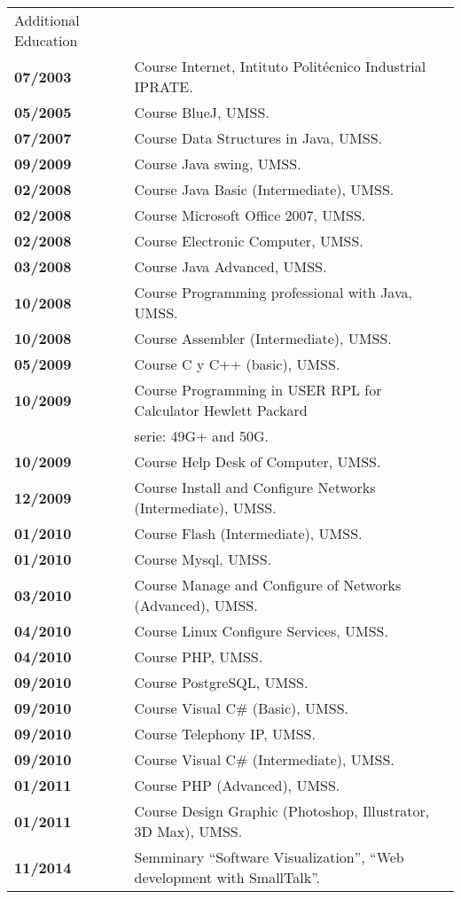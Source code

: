 \documentclass[letterpaper,11pt,oneside]{article}
\newcommand*{\textquotedouble}[1]{\textquotedblleft #1\textquotedblright}
\begin{document}
\noindent \begin{tabular}{l l}
	\Large{\textcolor{mygray}{Additional Education}} & \\	
	\textbf{07/2003} 	& Course Internet, Intituto Politécnico Industrial IPRATE. \\
 	\textbf{05/2005}	& Course BlueJ, UMSS. \\
 	\textbf{07/2007}	& Course Data Structures in Java, UMSS. \\
 	\textbf{09/2009}	& Course Java swing, UMSS. \\
 	\textbf{02/2008}	& Course Java Basic (Intermediate), UMSS. \\
 	\textbf{02/2008}	& Course Microsoft Office 2007, UMSS. \\
 	\textbf{02/2008}	& Course Electronic Computer, UMSS. \\
 	\textbf{03/2008}	& Course Java Advanced, UMSS. \\
 	\textbf{10/2008}	& Course Programming professional with Java, UMSS. \\
 	\textbf{10/2008}	& Course Assembler (Intermediate), UMSS. \\
 	\textbf{05/2009}	& Course C y C++ (basic), UMSS. \\
 	\textbf{10/2009}	& Course Programming in USER RPL for Calculator Hewlett Packard \\
 						& serie: 49G+ and 50G. \\  
 	\textbf{10/2009} 	& Course Help Desk of Computer, UMSS. \\
 	\textbf{12/2009}	& Course Install and Configure Networks (Intermediate), UMSS. \\
 	\textbf{01/2010}	& Course Flash (Intermediate), UMSS. \\
 	\textbf{01/2010}	& Course Mysql, UMSS. \\
 	\textbf{03/2010}	& Course Manage and Configure of Networks (Advanced), UMSS. \\
 	\textbf{04/2010}	& Course Linux Configure Services, UMSS. \\
 	\textbf{04/2010}	& Course PHP, UMSS. \\
 	\textbf{09/2010}	& Course PostgreSQL, UMSS. \\
 	\textbf{09/2010}	& Course Visual C\# (Basic), UMSS.\\
 	\textbf{09/2010}	& Course Telephony IP, UMSS. \\
 	\textbf{09/2010}	& Course Visual C\# (Intermediate), UMSS. \\ 	
 	\textbf{01/2011}	& Course PHP (Advanced), UMSS. \\
 	\textbf{01/2011}	& Course Design Graphic (Photoshop, Illustrator, 3D Max), UMSS. \\
 	\textbf{11/2014}	& Semminary \textquotedouble{Software Visualization}, \textquotedouble{Web development with SmallTalk}. \\
\end{tabular}
\end{document}
